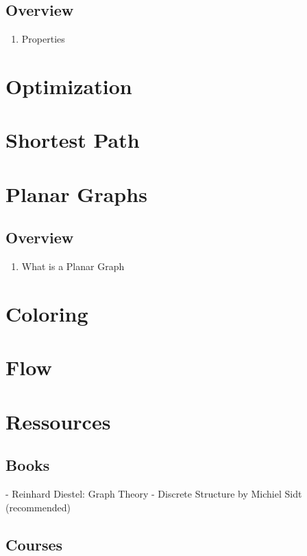 \documentclass{article}
\begin{document}
\subsection{Overview}%
\label{sub:Overview}

\begin{enumerate}
    \item Properties
\end{enumerate}



\section{Optimization}
\section{Shortest Path}
\section{Planar Graphs}

\subsection{Overview}%
\label{sub:Overview}

\begin{enumerate}
    \item What is a Planar Graph
\end{enumerate}

\section{Coloring}
\section{Flow}

\section{Ressources}%
\label{sec:Ressources}

\subsection{Books}%
\label{sub:Books}

- Reinhard Diestel: Graph Theory
- Discrete Structure by Michiel Sidt (recommended)

\subsection{Courses}%
\label{sub:Courses}
\end{document}
